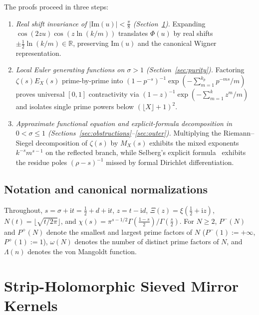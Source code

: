 \documentclass[11pt,reqno]{amsart}
\theoremstyle{definition}
\theoremstyle{remark}
\numberwithin{equation}{section}
\newcommand{\R}{\mathbb{R}}
\newcommand{\ii}{\mathrm{i}}
\newcommand{\Ima}{\mathrm{Im}}
\begin{document}
The proofs proceed in three steps:
\begin{enumerate}[label=\textup{(\arabic*)},leftmargin=2.2em]
\item \textit{Real shift invariance of $\lvert\Ima(u)\rvert < \frac{\pi}{8}$ (Section~\ref{sec:kernel}).} Expanding $\cos(2zu)\allowbreak\cos(z\ln(k/m))$ translates $\Phi(u)$ by real shifts $\pm\frac{1}{2}\ln(k/m) \in \R$, preserving $\Ima(u)$ and the canonical Wigner representation.
\item \textit{Local Euler generating functions on $\sigma > 1$ (Section~\ref{sec:purity}).} Factoring $\zeta(s)E_X(s)$ prime-by-prime into $(1 - p^{-s})^{-1}\exp(-\sum_{m=1}^{k_p} p^{-ms}/m)$ proves universal $[0,1]$ contractivity via $(1-z)^{-1}\exp(-\sum_{m=1}^k z^m/m)$ and isolates single prime powers below $(\lfloor X\rfloor+1)^2$.
\item \textit{Approximate functional equation and explicit-formula decomposition in $0 < \sigma \le 1$ (Sections~\ref{sec:obstructions}--\ref{sec:outer}).} Multiplying the Riemann--Siegel decomposition of $\zeta(s)$ by $M_X(s)$ exhibits the mixed exponents $k^{-s}m^{s-1}$ on the reflected branch, while Selberg's explicit formula~\cite{selberg1946} exhibits the residue poles $(\rho - s)^{-1}$ missed by formal Dirichlet differentiation.
\end{enumerate}

\subsection{Notation and canonical normalizations}\label{subsec:notation}

Throughout, $s = \sigma + \ii t = \frac{1}{2} + d + \ii t$, $z = t - \ii d$, $\Xi(z) = \xi(\frac{1}{2}+\ii z)$, $N(t) = \lfloor\sqrt{t/2\pi}\rfloor$, and $\chi(s) = \pi^{s-1/2}\Gamma(\frac{1-s}{2})/\Gamma(\frac{s}{2})$. For $N \ge 2$, $P^-(N)$ and $P^+(N)$ denote the smallest and largest prime factors of $N$ ($P^-(1) := +\infty$, $P^+(1) := 1$), $\omega(N)$ denotes the number of distinct prime factors of $N$, and $\Lambda(n)$ denotes the von Mangoldt function.

\section{Strip-Holomorphic Sieved Mirror Kernels}\label{sec:kernel}
\end{document}
